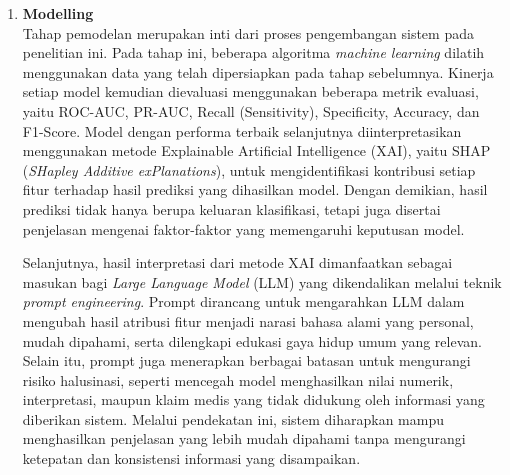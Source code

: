 \begin{enumerate}
\item \textbf{Modelling}\\
Tahap pemodelan merupakan inti dari proses pengembangan sistem pada penelitian ini. Pada tahap ini, beberapa algoritma \textit{machine learning} dilatih menggunakan data yang telah dipersiapkan pada tahap sebelumnya. Kinerja setiap model kemudian dievaluasi menggunakan beberapa metrik evaluasi, yaitu ROC-AUC, PR-AUC, Recall (Sensitivity), Specificity, Accuracy, dan F1-Score. Model dengan performa terbaik selanjutnya diinterpretasikan menggunakan metode Explainable Artificial Intelligence (XAI), yaitu SHAP (\textit{SHapley Additive exPlanations}), untuk mengidentifikasi kontribusi setiap fitur terhadap hasil prediksi yang dihasilkan model. Dengan demikian, hasil prediksi tidak hanya berupa keluaran klasifikasi, tetapi juga disertai penjelasan mengenai faktor-faktor yang memengaruhi keputusan model.

Selanjutnya, hasil interpretasi dari metode XAI dimanfaatkan sebagai masukan bagi \textit{Large Language Model} (LLM) yang dikendalikan melalui teknik \textit{prompt engineering}. Prompt dirancang untuk mengarahkan LLM dalam mengubah hasil atribusi fitur menjadi narasi bahasa alami yang personal, mudah dipahami, serta dilengkapi edukasi gaya hidup umum yang relevan. Selain itu, prompt juga menerapkan berbagai batasan untuk mengurangi risiko halusinasi, seperti mencegah model menghasilkan nilai numerik, interpretasi, maupun klaim medis yang tidak didukung oleh informasi yang diberikan sistem. Melalui pendekatan ini, sistem diharapkan mampu menghasilkan penjelasan yang lebih mudah dipahami tanpa mengurangi ketepatan dan konsistensi informasi yang disampaikan.


\end{enumerate}
